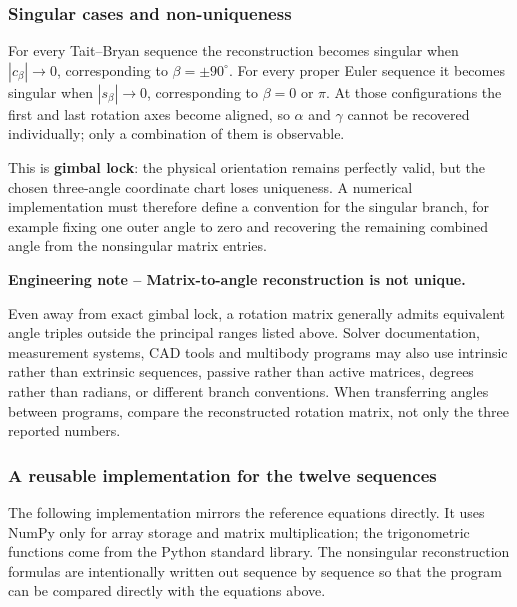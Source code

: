 \subsubsection{Singular cases and non-uniqueness}

For every Tait--Bryan sequence the reconstruction becomes singular when
$|c_\beta|\rightarrow0$, corresponding to $\beta=\pm90^\circ$. For every
proper Euler sequence it becomes singular when $|s_\beta|\rightarrow0$,
corresponding to $\beta=0$ or $\pi$. At those configurations the first and last
rotation axes become aligned, so $\alpha$ and $\gamma$ cannot be recovered
individually; only a combination of them is observable.

This is \textbf{gimbal lock}: the physical orientation remains perfectly valid,
but the chosen three-angle coordinate chart loses uniqueness. A numerical
implementation must therefore define a convention for the singular branch, for
example fixing one outer angle to zero and recovering the remaining combined
angle from the nonsingular matrix entries.

\begin{bbox}
\textbf{Engineering note -- Matrix-to-angle reconstruction is not unique.}

Even away from exact gimbal lock, a rotation matrix generally admits equivalent
angle triples outside the principal ranges listed above. Solver documentation,
measurement systems, CAD tools and multibody programs may also use intrinsic
rather than extrinsic sequences, passive rather than active matrices, degrees
rather than radians, or different branch conventions. When transferring angles
between programs, compare the reconstructed rotation matrix, not only the three
reported numbers.
\end{bbox}

\subsubsection{A reusable implementation for the twelve sequences}

The following implementation mirrors the reference equations directly. It uses
NumPy only for array storage and matrix multiplication; the trigonometric
functions come from the Python standard library. The nonsingular reconstruction
formulas are intentionally written out sequence by sequence so that the program
can be compared directly with the equations above.

